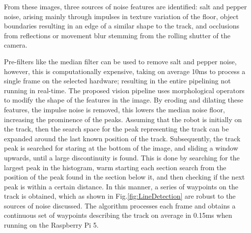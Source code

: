         From these images, three sources of noise features are identified: salt and pepper noise, arising mainly through impulses in texture 
        variation of the floor, object boundaries resulting in an edge of a similar shape to the track, and occlusions from reflections 
        or movement blur stemming from the rolling shutter of the camera.

        Pre-filters like the median filter can be used to remove salt and pepper noise, however, this is computationally expensive, taking on average 10ms
        to process a single frame on the selected hardware; resulting in the entire pipelining not running in real-time. 
        The proposed vision pipeline uses morphological operators to modify the shape of the features in the image.
        By eroding and dilating these features, the impulse noise is removed, this lowers the median noise floor, increasing the prominence of the peaks. 
        Assuming that the robot is initially on the track, then the search space for the peak representing the track can be expanded around the last
        known position of the track. Subsequently, the track peak is searched for staring at the bottom of the image, and sliding a window upwards, 
        until a large discontinuity is found. This is done by searching for the largest peak in the histogram, warm starting each section search from the position 
        of the peak found in the section below it, and then checking if the next peak is within a certain distance. In this manner,
        a series of waypoints on the track is obtained, which as shown in Fig.\ref{fig:LineDetection} are robust to the sources of noise discussed. 
        The algorithm processes each frame and obtains a continuous set of waypoints describing the track on average in 0.15ms when running on the Raspberry Pi 5.
